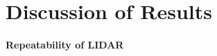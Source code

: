 \chapter{Discussion of Results}
\label{chap:results}






\subsubsection{Repeatability of LIDAR}
\label{sec:markerdetectionaccuracy}